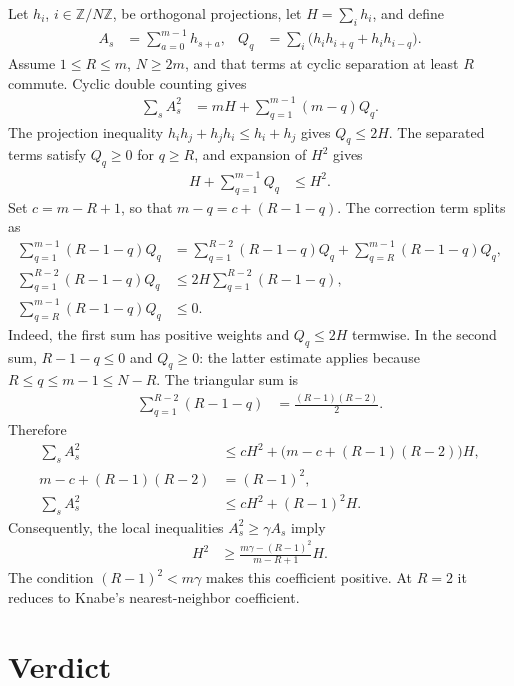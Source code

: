 \documentclass{article}
\begin{document}
Let $h_i$, $i\in\mathbb Z/N\mathbb Z$, be orthogonal projections, let
$H=\sum_i h_i$, and define
\begin{align}
    A_s&=\sum_{a=0}^{m-1}h_{s+a},
    &Q_q&=\sum_i\bigl(h_i h_{i+q}+h_i h_{i-q}\bigr).
\end{align}
Assume $1\leq R\leq m$, $N\geq2m$, and that terms at cyclic separation at
least $R$ commute. Cyclic double counting gives
\begin{align}
    \sum_s A_s^2&=mH+\sum_{q=1}^{m-1}(m-q)Q_q.
\end{align}
The projection inequality $h_i h_j+h_j h_i\leq h_i+h_j$ gives $Q_q\leq2H$.
The separated terms satisfy $Q_q\geq0$ for $q\geq R$, and expansion of $H^2$
gives
\begin{align}
    H+\sum_{q=1}^{m-1}Q_q&\leq H^2.
\end{align}
Set $c=m-R+1$, so that $m-q=c+(R-1-q)$. The correction term splits as
\begin{align}
    \sum_{q=1}^{m-1}(R-1-q)Q_q
    &=\sum_{q=1}^{R-2}(R-1-q)Q_q
      +\sum_{q=R}^{m-1}(R-1-q)Q_q,\\
    \sum_{q=1}^{R-2}(R-1-q)Q_q
    &\leq 2H\sum_{q=1}^{R-2}(R-1-q),\\
    \sum_{q=R}^{m-1}(R-1-q)Q_q
    &\leq0.
\end{align}
Indeed, the first sum has positive weights and $Q_q\leq2H$ termwise. In the
second sum, $R-1-q\leq0$ and $Q_q\geq0$: the latter estimate applies because
$R\leq q\leq m-1\leq N-R$. The triangular sum is
\begin{align}
    \sum_{q=1}^{R-2}(R-1-q)
    &=\frac{(R-1)(R-2)}{2}.
\end{align}
Therefore
\begin{align}
    \sum_s A_s^2
    &\leq cH^2+\bigl(m-c+(R-1)(R-2)\bigr)H,\\
    m-c+(R-1)(R-2)
    &=(R-1)^2,\\
    \sum_s A_s^2
    &\leq cH^2+(R-1)^2H.
\end{align}
Consequently, the local inequalities $A_s^2\geq\gamma A_s$ imply
\begin{align}
    H^2&\geq\frac{m\gamma-(R-1)^2}{m-R+1}H.
\end{align}
The condition $(R-1)^2<m\gamma$ makes this coefficient positive. At $R=2$
it reduces to Knabe's nearest-neighbor coefficient.

\section{Verdict}
\end{document}
